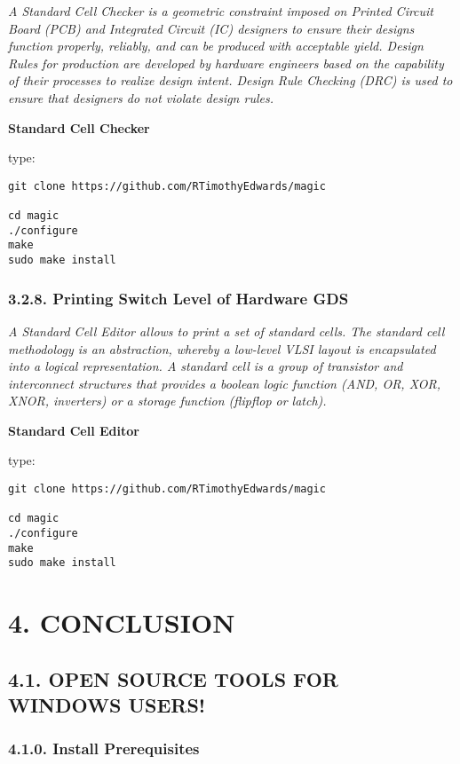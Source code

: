\documentclass[]{article}
\begin{document}
\emph{A Standard Cell Checker is a geometric constraint imposed on
Printed Circuit Board (PCB) and Integrated Circuit (IC) designers to
ensure their designs function properly, reliably, and can be produced
with acceptable yield. Design Rules for production are developed by
hardware engineers based on the capability of their processes to realize
design intent. Design Rule Checking (DRC) is used to ensure that
designers do not violate design rules.}

\textbf{Standard Cell Checker}

type:

\begin{verbatim}
git clone https://github.com/RTimothyEdwards/magic

cd magic
./configure
make
sudo make install
\end{verbatim}

\subsubsection{3.2.8. Printing Switch Level of Hardware
GDS}\label{printing-switch-level-of-hardware-gds}

\emph{A Standard Cell Editor allows to print a set of standard cells.
The standard cell methodology is an abstraction, whereby a low-level
VLSI layout is encapsulated into a logical representation. A standard
cell is a group of transistor and interconnect structures that provides
a boolean logic function (AND, OR, XOR, XNOR, inverters) or a storage
function (flipflop or latch).}

\textbf{Standard Cell Editor}

type:

\begin{verbatim}
git clone https://github.com/RTimothyEdwards/magic

cd magic
./configure
make
sudo make install
\end{verbatim}

\section{4. CONCLUSION}\label{conclusion}

\subsection{4.1. OPEN SOURCE TOOLS FOR WINDOWS
USERS!}\label{open-source-tools-for-windows-users}

\subsubsection{4.1.0. Install
Prerequisites}\label{install-prerequisites}
\end{document}
